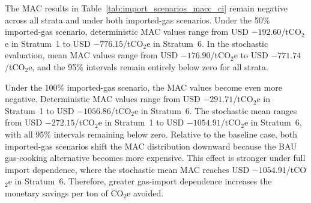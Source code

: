 \documentclass[authoryear,preprint,review,10pt]{elsarticle}
\begin{document}
\begin{table}[htbp]
\centering
\caption{TCO under imported-gas scenarios in Bogotá: BAU gas cost and deterministic $\Delta TCO$}
\label{tab:import_scenarios_tco_det}
\end{table}

The MAC results in Table~\ref{tab:import_scenarios_macc_ci} remain negative across all strata and under both imported-gas scenarios. Under the 50\% imported-gas scenario, deterministic MAC values range from USD $-192.60$/tCO$_2$e in Stratum~1 to USD $-776.15$/tCO$_2$e in Stratum~6. In the stochastic evaluation, mean MAC values range from USD $-176.90$/tCO$_2$e to USD $-771.74$/tCO$_2$e, and the 95\% intervals remain entirely below zero for all strata.

Under the 100\% imported-gas scenario, the MAC values become even more negative. Deterministic MAC values range from USD $-291.71$/tCO$_2$e in Stratum~1 to USD $-1056.86$/tCO$_2$e in Stratum~6. The stochastic mean ranges from USD $-272.15$/tCO$_2$e in Stratum~1 to USD $-1054.91$/tCO$_2$e in Stratum~6, with all 95\% intervals remaining below zero. Relative to the baseline case, both imported-gas scenarios shift the MAC distribution downward because the BAU gas-cooking alternative becomes more expensive. This effect is stronger under full import dependence, where the stochastic mean MAC reaches USD $-1054.91$/tCO$_2$e in Stratum~6. Therefore, greater gas-import dependence increases the monetary savings per ton of CO$_2$e avoided.
\end{document}
